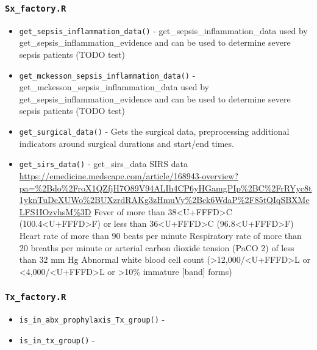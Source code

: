 \documentclass[
]{book}
\providecommand{\tightlist}{%
  \setlength{\itemsep}{0pt}\setlength{\parskip}{0pt}}
\begin{document}
\hypertarget{sx_factory.r}{%
\subsubsection{\texorpdfstring{\texttt{Sx\_factory.R}}{Sx\_factory.R}}\label{sx_factory.r}}

\begin{itemize}
\tightlist
\item
  \texttt{get\_sepsis\_inflammation\_data()} - get\_sepsis\_inflammation\_data used by get\_sepsis\_inflammation\_evidence and can be used to determine severe sepsis patients (TODO test)
\item
  \texttt{get\_mckesson\_sepsis\_inflammation\_data()} - get\_mckesson\_sepsis\_inflammation\_data used by get\_sepsis\_inflammation\_evidence and can be used to determine severe sepsis patients (TODO test)
\item
  \texttt{get\_surgical\_data()} - Gets the surgical data, preprocessing additional indicators around surgical durations and start/end times.
\item
  \texttt{get\_sirs\_data()} - get\_sirs\_data SIRS data \url{https://emedicine.medscape.com/article/168943-overview?pa=\%2Bdo\%2FroX1QZfjH7O89V94ALIh4CP6yHGamgPIp\%2BC\%2FrRYyc8t1yknTuDcXUWo\%2BUXzrdRAKg3zHmuVy\%2Bck6WdaP\%2F85tQIqSBXMeLFS1IOzvhsM\%3D} Fever of more than 38\textless U+FFFD\textgreater C (100.4\textless U+FFFD\textgreater F) or less than 36\textless U+FFFD\textgreater C (96.8\textless U+FFFD\textgreater F) Heart rate of more than 90 beats per minute Respiratory rate of more than 20 breaths per minute or arterial carbon dioxide tension (PaCO 2) of less than 32 mm Hg Abnormal white blood cell count (\textgreater12,000/\textless U+FFFD\textgreater L or \textless4,000/\textless U+FFFD\textgreater L or \textgreater10\% immature {[}band{]} forms)
\end{itemize}

\hypertarget{tx_factory.r}{%
\subsubsection{\texorpdfstring{\texttt{Tx\_factory.R}}{Tx\_factory.R}}\label{tx_factory.r}}

\begin{itemize}
\tightlist
\item
  \texttt{is\_in\_abx\_prophylaxis\_Tx\_group()} -
\item
  \texttt{is\_in\_tx\_group()} -
\end{itemize}
\end{document}
